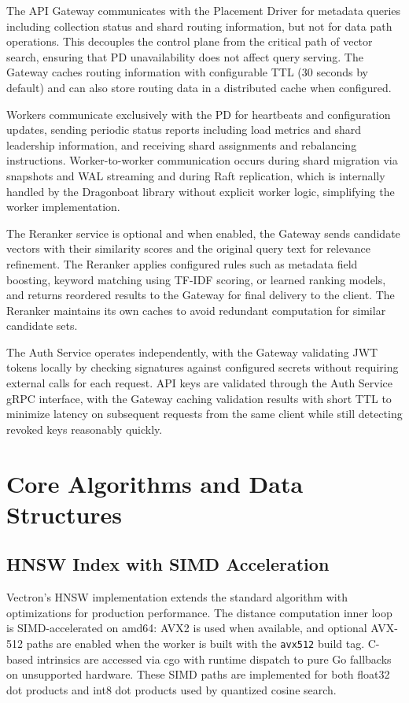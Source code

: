 \documentclass[conference]{IEEEtran}
\begin{document}
The API Gateway communicates with the Placement Driver for metadata queries including collection status and shard routing information, but not for data path operations. This decouples the control plane from the critical path of vector search, ensuring that PD unavailability does not affect query serving. The Gateway caches routing information with configurable TTL (30 seconds by default) and can also store routing data in a distributed cache when configured.

Workers communicate exclusively with the PD for heartbeats and configuration updates, sending periodic status reports including load metrics and shard leadership information, and receiving shard assignments and rebalancing instructions. Worker-to-worker communication occurs during shard migration via snapshots and WAL streaming and during Raft replication, which is internally handled by the Dragonboat library without explicit worker logic, simplifying the worker implementation.

The Reranker service is optional and when enabled, the Gateway sends candidate vectors with their similarity scores and the original query text for relevance refinement. The Reranker applies configured rules such as metadata field boosting, keyword matching using TF-IDF scoring, or learned ranking models, and returns reordered results to the Gateway for final delivery to the client. The Reranker maintains its own caches to avoid redundant computation for similar candidate sets.

The Auth Service operates independently, with the Gateway validating JWT tokens locally by checking signatures against configured secrets without requiring external calls for each request. API keys are validated through the Auth Service gRPC interface, with the Gateway caching validation results with short TTL to minimize latency on subsequent requests from the same client while still detecting revoked keys reasonably quickly.

\section{Core Algorithms and Data Structures}

\subsection{HNSW Index with SIMD Acceleration}

Vectron's HNSW implementation extends the standard algorithm with optimizations for production performance. The distance computation inner loop is SIMD-accelerated on amd64: AVX2 is used when available, and optional AVX-512 paths are enabled when the worker is built with the \texttt{avx512} build tag. C-based intrinsics are accessed via cgo with runtime dispatch to pure Go fallbacks on unsupported hardware. These SIMD paths are implemented for both float32 dot products and int8 dot products used by quantized cosine search.
\end{document}
